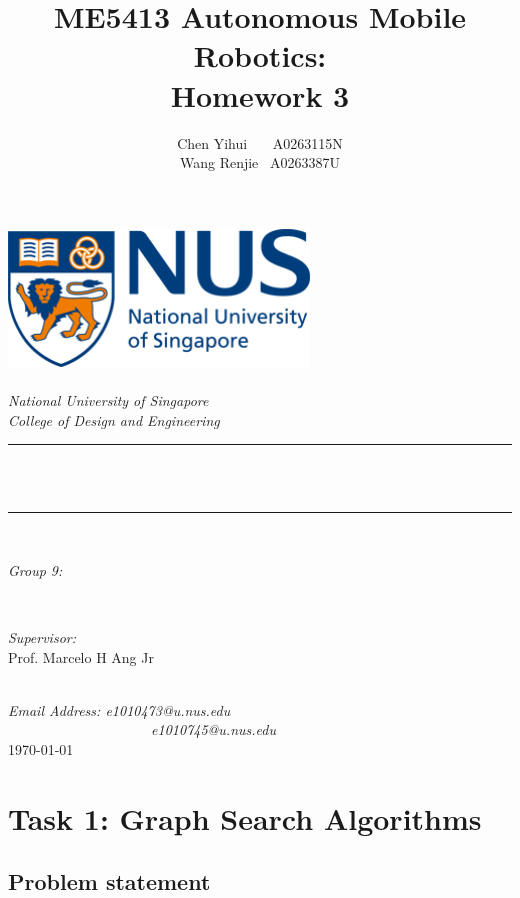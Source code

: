 \documentclass[hyperref]{article}
\title{ME5413 Autonomous Mobile Robotics: \\ Homework 3}
\author{\textup{Chen Yihui \ \ \ A0263115N \\ Wang Renjie \ A0263387U }}
\theoremstyle{nonumberplain}
\begin{document}
	\begin{titlepage}
		\center
		\newcommand{\HRule}{\rule{\linewidth}{0.5mm}}
		\includegraphics[width=8cm]{logo.png}\\[1cm] 
		\quad\\[2cm]
		\textsl{\Large National University of Singapore}\\[0.5cm] 
		\textsl{\large College of Design and Engineering}\\[0.5cm]
		\makeatletter
		\HRule \\[0.4cm]
		{ \huge \bfseries \@title}\\[0.4cm] 
		\HRule \\[2cm]
		\begin{minipage}{0.4\textwidth}
			\begin{flushleft} \large
				\emph{Group 9:}\\
				\@author 
			\end{flushleft}
		\end{minipage}
		~
		\begin{minipage}{0.4\textwidth}
			\begin{flushright} \large
				\emph{Supervisor:} \\
				\textup{Prof. Marcelo H Ang Jr}
			\end{flushright}
		\end{minipage}\\[3cm]
		\makeatother
		{\large \emph{Email Address: e1010473@u.nus.edu \\	\ \ \ \ \ \ \ \ \ \ \ \ \ \ \ \ \ \ \ \ e1010745@u.nus.edu}}\\[0.5cm]
		{\large \today}\\[2cm] 
		\vfill 
	\end{titlepage}

\section{Task 1: Graph Search Algorithms}

\subsection{Problem statement}
\hspace{1.0em}
\end{document}
